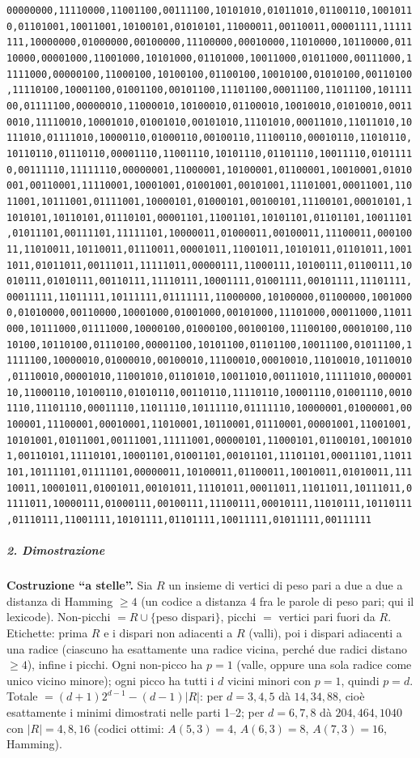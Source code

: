 \documentclass[11pt,a4paper]{article}
\begin{document}
\texttt{00000000,11110000,11001100,00111100,10101010,01011010,01100110,10010110,01101001,10011001,10100101,01010101,11000011,00110011,00001111,11111111,10000000,01000000,00100000,11100000,00010000,11010000,10110000,01110000,00001000,11001000,10101000,01101000,10011000,01011000,00111000,11111000,00000100,11000100,10100100,01100100,10010100,01010100,00110100,11110100,10001100,01001100,00101100,11101100,00011100,11011100,10111100,01111100,00000010,11000010,10100010,01100010,10010010,01010010,00110010,11110010,10001010,01001010,00101010,11101010,00011010,11011010,10111010,01111010,10000110,01000110,00100110,11100110,00010110,11010110,10110110,01110110,00001110,11001110,10101110,01101110,10011110,01011110,00111110,11111110,00000001,11000001,10100001,01100001,10010001,01010001,00110001,11110001,10001001,01001001,00101001,11101001,00011001,11011001,10111001,01111001,10000101,01000101,00100101,11100101,00010101,11010101,10110101,01110101,00001101,11001101,10101101,01101101,10011101,01011101,00111101,11111101,10000011,01000011,00100011,11100011,00010011,11010011,10110011,01110011,00001011,11001011,10101011,01101011,10011011,01011011,00111011,11111011,00000111,11000111,10100111,01100111,10010111,01010111,00110111,11110111,10001111,01001111,00101111,11101111,00011111,11011111,10111111,01111111,11000000,10100000,01100000,10010000,01010000,00110000,10001000,01001000,00101000,11101000,00011000,11011000,10111000,01111000,10000100,01000100,00100100,11100100,00010100,11010100,10110100,01110100,00001100,10101100,01101100,10011100,01011100,11111100,10000010,01000010,00100010,11100010,00010010,11010010,10110010,01110010,00001010,11001010,01101010,10011010,00111010,11111010,00000110,11000110,10100110,01010110,00110110,11110110,10001110,01001110,00101110,11101110,00011110,11011110,10111110,01111110,10000001,01000001,00100001,11100001,00010001,11010001,10110001,01110001,00001001,11001001,10101001,01011001,00111001,11111001,00000101,11000101,01100101,10010101,00110101,11110101,10001101,01001101,00101101,11101101,00011101,11011101,10111101,01111101,00000011,10100011,01100011,10010011,01010011,11110011,10001011,01001011,00101011,11101011,00011011,11011011,10111011,01111011,10000111,01000111,00100111,11100111,00010111,11010111,10110111,01110111,11001111,10101111,01101111,10011111,01011111,00111111}

\subparagraph{2. Dimostrazione}\label{dimostrazione}

\textbf{Costruzione ``a stelle''.} Sia \(R\) un insieme di vertici di
peso pari a due a due a distanza di Hamming \(\ge4\) (un codice a
distanza 4 fra le parole di peso pari; qui il lexicode). Non-picchi
\(=R\cup\{\text{peso dispari}\}\), picchi \(=\) vertici pari fuori da
\(R\). Etichette: prima \(R\) e i dispari non adiacenti a \(R\) (valli),
poi i dispari adiacenti a una radice (ciascuno ha esattamente una radice
vicina, perché due radici distano \(\ge4\)), infine i picchi. Ogni
non-picco ha \(p=1\) (valle, oppure una sola radice come unico vicino
minore); ogni picco ha tutti i \(d\) vicini minori con \(p=1\), quindi
\(p=d\). Totale \(=(d+1)2^{d-1}-(d-1)|R|\): per \(d=3,4,5\) dà
\(14,34,88\), cioè esattamente i minimi dimostrati nelle parti 1--2; per
\(d=6,7,8\) dà \(204,464,1040\) con \(|R|=4,8,16\) (codici ottimi:
\(A(5,3)=4\), \(A(6,3)=8\), \(A(7,3)=16\), Hamming).
\end{document}
